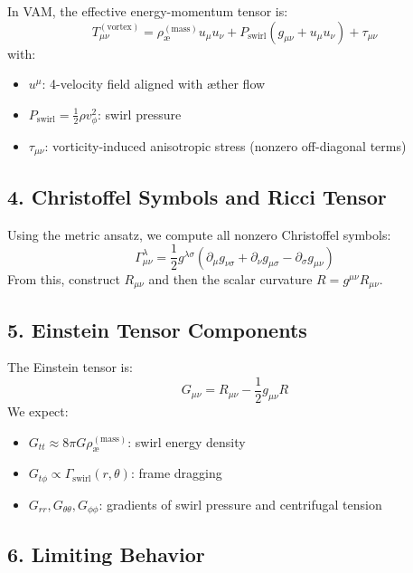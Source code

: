 \documentclass[twocolumn,aps,pre,floatfix,nofootinbib]{revtex4-2}
\begin{document}
    In VAM, the effective energy-momentum tensor is:
    \begin{equation}
        T_{\mu\nu}^{(\text{vortex})} = \rho_{\text{\ae}}^{(\text{mass})} u_\mu u_\nu + P_{\text{swirl}} \left( g_{\mu\nu} + u_\mu u_\nu \right) + \tau_{\mu\nu}
    \end{equation}
    with:
    \begin{itemize}
        \item \( u^\mu \): 4-velocity field aligned with æther flow
        \item \( P_{\text{swirl}} = \frac{1}{2}\rho v_\phi^2 \): swirl pressure
        \item \( \tau_{\mu\nu} \): vorticity-induced anisotropic stress (nonzero off-diagonal terms)
    \end{itemize}

    \subsection*{4. Christoffel Symbols and Ricci Tensor}

    Using the metric ansatz, we compute all nonzero Christoffel symbols:
    \[
        \Gamma^\lambda_{\mu\nu} = \frac{1}{2} g^{\lambda\sigma} \left( \partial_\mu g_{\nu\sigma} + \partial_\nu g_{\mu\sigma} - \partial_\sigma g_{\mu\nu} \right)
    \]
    From this, construct \(R_{\mu\nu}\) and then the scalar curvature \(R = g^{\mu\nu} R_{\mu\nu}\).

    \subsection*{5. Einstein Tensor Components}

    The Einstein tensor is:
    \[
        G_{\mu\nu} = R_{\mu\nu} - \frac{1}{2}g_{\mu\nu}R
    \]
    We expect:
    \begin{itemize}
        \item \( G_{tt} \approx 8\pi G \rho_{\text{\ae}}^{(\text{mass})} \): swirl energy density
        \item \( G_{t\phi} \propto \Gamma_{\text{swirl}}(r,\theta) \): frame dragging
        \item \( G_{rr}, G_{\theta\theta}, G_{\phi\phi} \): gradients of swirl pressure and centrifugal tension
    \end{itemize}

    \subsection*{6. Limiting Behavior}
\end{document}

